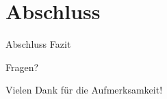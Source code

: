 \documentclass[aspectratio=1610]{beamer}
\begin{document}
\section{Abschluss}
\label{sec:orge1e678c}
\begin{frame}[label={sec:org3fba83f}]{Abschluss}
\alert{Fazit}
\end{frame}

\begin{frame}[label={sec:orgf7ac1b9}]{}
\alert{\huge{Fragen?}}
\end{frame}
\begin{frame}[label={sec:orgc8de723}]{}
\alert{\huge{Vielen Dank für die Aufmerksamkeit!}}
\end{frame}
\end{document}
